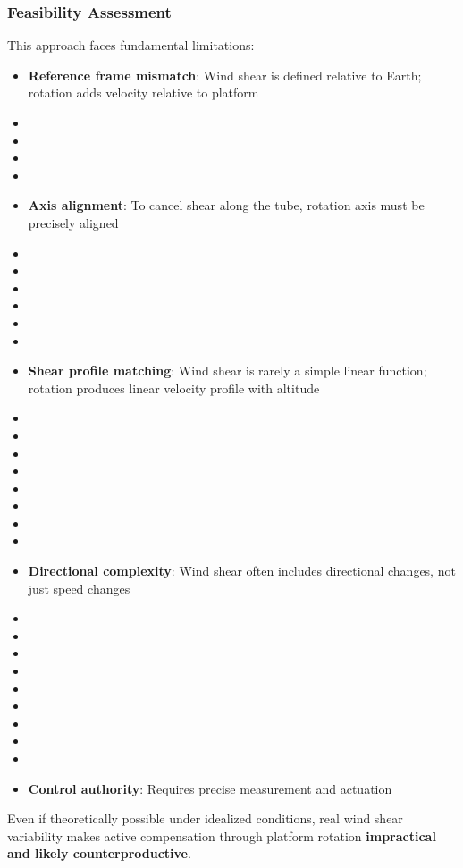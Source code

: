 {{{{\subsubsection{Feasibility Assessment}
This approach faces fundamental limitations:
\begin{itemize}
    \item \textbf{Reference frame mismatch}: Wind shear is defined relative to Earth; rotation adds velocity relative to platform
    \item \item \item \item \item \textbf{Axis alignment}: To cancel shear along the tube, rotation axis must be precisely aligned
    \item \item \item \item \item \item \item \textbf{Shear profile matching}: Wind shear is rarely a simple linear function; rotation produces linear velocity profile with altitude
    \item \item \item \item \item \item \item \item \item \textbf{Directional complexity}: Wind shear often includes directional changes, not just speed changes
    \item \item \item \item \item \item \item \item \item \item \textbf{Control authority}: Requires precise measurement and actuation
\end{itemize}
Even if theoretically possible under idealized conditions, real wind shear variability makes active compensation through platform rotation \textbf{impractical and likely counterproductive}.

}}}}
